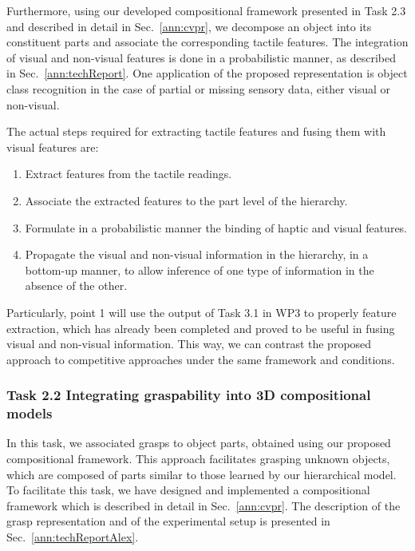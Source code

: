 \documentclass[a4paper,11pt,pdf]{pacmanreport}
\begin{document}
Furthermore, using our developed compositional framework presented in Task 2.3 
and described in detail in Sec.~\ref{ann:cvpr}, we decompose an object into its 
constituent parts and associate the corresponding tactile features. The 
integration of visual and non-visual features is done in a probabilistic manner, 
as described in Sec.~\ref{ann:techReport}. One 
application of the proposed representation is object class recognition in the case 
of partial or missing sensory data, either visual or non-visual.

The actual steps required for extracting tactile features and fusing them with 
visual features are:

\begin{enumerate}

\item Extract features from the tactile readings.
\item Associate the extracted features to the part level of the hierarchy.
\item Formulate in a probabilistic manner the binding of haptic and visual features.
\item Propagate the visual and non-visual information in the
  hierarchy, in a bottom-up manner, to allow inference of one type of
  information in the absence of the other.
\end{enumerate}


Particularly, point 1 will use the output of Task 3.1 in WP3 to properly feature extraction, which has already been completed and proved to be useful in fusing visual and non-visual information. This way, we can contrast the proposed approach to competitive approaches under the same framework and conditions.

\subsubsection{Task 2.2 Integrating graspability into 3D compositional models}

In this task, we associated grasps to object parts, obtained using our proposed 
compositional framework. This approach facilitates grasping unknown objects, 
which are composed of parts similar to those learned by our hierarchical model. 
To facilitate this task, we have designed and implemented a compositional 
framework which is described in detail in Sec.~\ref{ann:cvpr}. The description 
of the grasp representation and of the experimental setup is presented in Sec.~\ref{ann:techReportAlex}.
\end{document}
